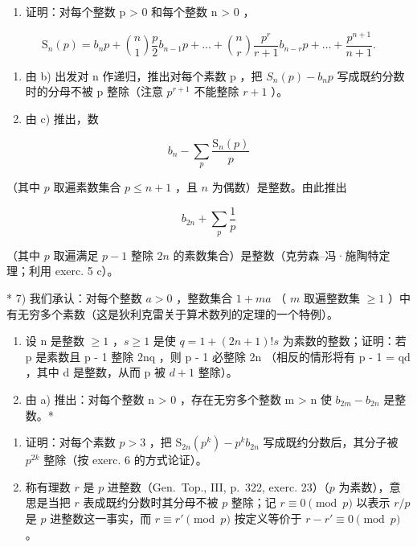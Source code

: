 \begin{enumerate}
\def\labelenumi{\alph{enumi})}
\setcounter{enumi}{1}
\tightlist
\item
  证明：对每个整数 p \textgreater{} 0 和每个整数 n \textgreater{} 0 ，
\end{enumerate}

\[
\mathrm{S} _ {n} (p) = b _ {n} p + \binom {n} {1} \frac {p}{2} b _ {n - 1} p + \dots + \binom {n} {r} \frac {p ^ {r}}{r + 1} b _ {n - r} p + \dots + \frac {p ^ {n + 1}}{n + 1}.
\]

\begin{enumerate}
\def\labelenumi{\alph{enumi})}
\setcounter{enumi}{2}
\item
  由 b) 出发对 n 作递归，推出对每个素数 p ，把 \(S_{n}(p) - b_{n}p\) 写成既约分数时的分母不被 p 整除（注意 \(p^{r+1}\) 不能整除 \(r + 1\) ）。
\item
  由 c) 推出，数
\end{enumerate}

\[
b _ {n} - \sum_ {p} \frac {\mathrm{S} _ {n} (p)}{p}
\]

（其中 \(p\) 取遍素数集合 \(p \leqslant n + 1\) ，且 \(n\) 为偶数）是整数。由此推出

\[
b _ {2 n} + \sum_ {p} \frac {1}{p}
\]

（其中 \(p\) 取遍满足 \(p - 1\) 整除 \(2n\) 的素数集合）是整数（克劳森–冯·施陶特定理；利用 exerc. 5 c）。

* 7) 我们承认：对每个整数 \(a > 0\) ，整数集合 \(1 + ma\) （ \(m\) 取遍整数集 \(\geqslant 1\) ）中有无穷多个素数（这是狄利克雷关于算术数列的定理的一个特例）。

\begin{enumerate}
\def\labelenumi{\alph{enumi})}
\item
  设 n 是整数 \(\geqslant 1\) ，\(s \geqslant 1\) 是使 \(q = 1 + (2n + 1)!s\) 为素数的整数；证明：若 p 是素数且 p - 1 整除 2nq ，则 p - 1 必整除 2n （相反的情形将有 p - 1 = qd ，其中 d 是整数，从而 p 被 \(d + 1\) 整除）。
\item
  由 a) 推出：对每个整数 n \textgreater{} 0 ，存在无穷多个整数 m \textgreater{} n 使 \(b_{2m} - b_{2n}\) 是整数。*
\end{enumerate}

\begin{enumerate}
\def\labelenumi{\arabic{enumi})}
\setcounter{enumi}{7}
\item
  证明：对每个素数 \(p > 3\) ，把 \(\mathrm{S}_{2n}(p^k) - p^k b_{2n}\) 写成既约分数后，其分子被 \(p^{2k}\) 整除（按 exerc. 6 的方式论证）。
\item
  称有理数 \(r\) 是 \(p\) 进整数（Gen.~Top., III, p.~322, exerc. 23）（\(p\) 为素数），意思是当把 \(r\) 表成既约分数时其分母不被 \(p\) 整除；记 \(r \equiv 0 \pmod{p}\) 以表示 \(r/p\) 是 \(p\) 进整数这一事实，而 \(r \equiv r' \pmod{p}\) 按定义等价于 \(r - r' \equiv 0 \pmod{p}\) 。
\end{enumerate}

